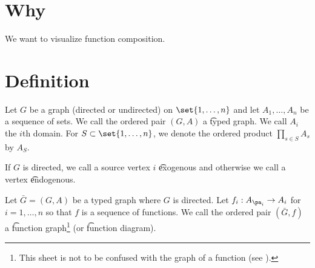 

\section*{Why}

We want to visualize function composition.

\section*{Definition}

Let $G$ be a graph (directed or undirected) on $\set{1, \dots , n}$ and let $A_1, \dots , A_n$ be a sequence of sets.
We call the ordered pair $(G, A)$ a \t{typed graph}.
We call $A_i$ the \t{$i$th domain}.
For $S \subset \set{1, \dots , n}$, we denote the ordered product $\prod_{s \in S} A_s$ by $A_S$.

If $G$ is directed, we call a source vertex $i$ \t{exogenous} and otherwise we call a vertex \t{endogenous}.

Let $\bar{G} = (G, A)$ be a typed graph where $G$ is directed.
Let $f_i: A_{\pa_{i}} \to A_i$ for $i = 1, \dots , n$ so that $f$ is a sequence of functions.
We call the ordered pair $(\bar{G}, f)$ a \t{function graph}\footnote{This sheet is not to be confused with the graph of a function (see ).}
(or \t{function diagram}).

\blankpage
